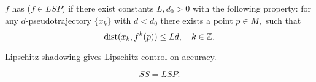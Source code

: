 \begin{deffnon}
$f$ has  ($f\in LSP$) if there exist constants
$L, d_0 > 0$ with the following property: for any $d$-pseudotrajectory $\{x_k\}$ with $d < d_0$ there exists a point $p\in M,$ such that
$$
\operatorname{dist}(x_{k},f^k(p)) \leq  Ld,\quad k\in\mathbb Z.
$$
\end{deffnon}
%
Lipschitz shadowing gives Lipschitz control on accuracy.
%
\begin{theoremnon} \label{thm:mainlip}
\alert{$$SS=LSP.$$}
\end{theoremnon} 
%
\devskip